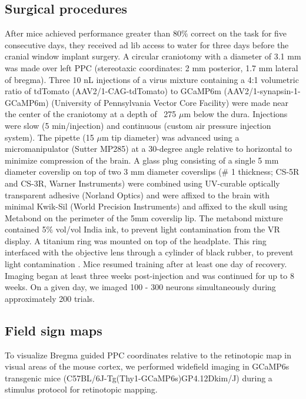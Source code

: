 \subsection{Surgical procedures}
After mice achieved performance greater than 80$\%$ correct on the task for five consecutive days, they received ad lib access to water for three days before the cranial window implant surgery. A circular craniotomy with a diameter of 3.1 mm was made over left PPC (stereotaxic coordinates: 2 mm posterior, 1.7 mm lateral of bregma). Three 10 nL injections of a virus mixture containing a 4:1 volumetric ratio of tdTomato (AAV2/1-CAG-tdTomato) to GCaMP6m (AAV2/1-synapsin-1-GCaMP6m) (University of Pennsylvania Vector Core Facility) were made near the center of the craniotomy at a depth of ~275 $\mu$m below the dura. Injections were slow (5 min/injection) and continuous (custom air pressure injection system). The pipette (15 $\mu$m tip diameter) was advanced using a micromanipulator (Sutter MP285) at a 30-degree angle relative to horizontal to minimize compression of the brain. A glass plug consisting of a single 5 mm diameter coverslip on top of two 3 mm diameter coverslips ($\#$ 1 thickness; CS-5R and CS-3R, Warner Instruments) were combined using UV-curable optically transparent adhesive (Norland Optics) and were affixed to the brain with minimal Kwik-Sil (World Precision Instruments) and affixed to the skull using Metabond on the perimeter of the 5mm coverslip lip. The metabond mixture contained 5$\%$ vol/vol India ink, to prevent light contamination from the VR display. A titanium ring was mounted on top of the headplate. This ring interfaced with the objective lens through a cylinder of black rubber, to prevent light contamination \citep{Dombeck2010}. Mice resumed training after at least one day of recovery. Imaging began at least three weeks post-injection and was continued for up to 8 weeks. On a given day, we imaged 100 - 300 neurons simultaneously during approximately 200 trials.

\subsection{Field sign maps}
To visualize Bregma guided PPC coordinates relative to the retinotopic map in visual areas of the mouse cortex, we performed widefield imaging in GCaMP6s transgenic mice (C57BL/6J-Tg(Thy1-GCaMP6s)GP4.12Dkim/J) during a stimulus protocol for retinotopic mapping.

